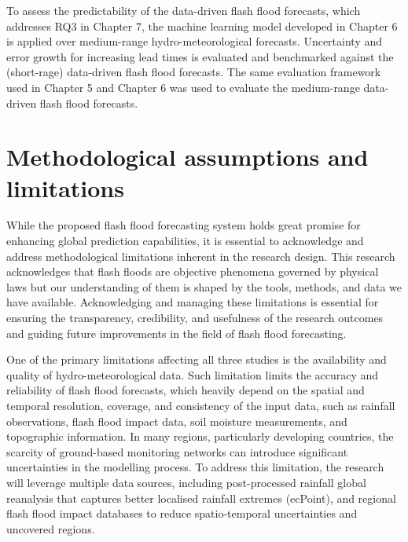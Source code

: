 To assess the predictability of the data-driven flash flood forecasts, which addresses RQ3 in Chapter 7, the machine learning model developed in Chapter 6 is applied over medium-range hydro-meteorological forecasts. Uncertainty and error growth for increasing lead times is evaluated and benchmarked against the (short-rage) data-driven flash flood forecasts. The same evaluation framework used in Chapter 5 and Chapter 6 was used to evaluate the medium-range data-driven flash flood forecasts.


\section{Methodological assumptions and limitations} 

While the proposed flash flood forecasting system holds great promise for enhancing global prediction capabilities, it is essential to acknowledge and address methodological limitations inherent in the research design. This research acknowledges that flash floods are objective phenomena governed by physical laws but our understanding of them is shaped by the tools, methods, and data we have available. Acknowledging and managing these limitations is essential for ensuring the transparency, credibility, and usefulness of the research outcomes and guiding future improvements in the field of flash flood forecasting.

One of the primary limitations affecting all three studies is the availability and quality of hydro-meteorological data. Such limitation limits the accuracy and reliability of flash flood forecasts, which heavily depend on the spatial and temporal resolution, coverage, and consistency of the input data, such as rainfall observations, flash flood impact data, soil moisture measurements, and topographic information. In many regions, particularly developing countries, the scarcity of ground-based monitoring networks can introduce significant uncertainties in the modelling process. To address this limitation, the research will leverage multiple data sources, including post-processed rainfall global reanalysis that captures better localised rainfall extremes (ecPoint), and regional flash flood impact databases to reduce spatio-temporal uncertainties and uncovered regions.

